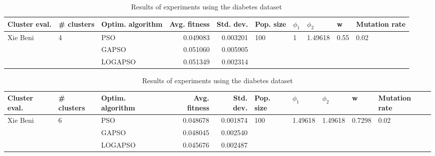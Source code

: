 \documentclass{article}
\begin{document}
\begin{table}
\centering
\caption{Results of experiments using the diabetes dataset}
\begin{tabular}{lllrrlllll}
\toprule
            Cluster eval. &        \# clusters & Optim. algorithm &  Avg. fitness &  Std. dev. &            Pop. size &         $\phi_{1}$ &               $\phi_{2}$ &                     w &         Mutation rate \\
\midrule
\multirow{3}{*}{Xie Beni} & \multirow{3}{*}{4} &              PSO &      0.049083 &   0.003201 & \multirow{3}{*}{100} & \multirow{3}{*}{1} & \multirow{3}{*}{1.49618} & \multirow{3}{*}{0.55} & \multirow{3}{*}{0.02} \\
                          &                    &            GAPSO &      0.051060 &   0.005905 &                      &                    &                          &                       &                       \\
                          &                    &          LOGAPSO &      0.051349 &   0.002314 &                      &                    &                          &                       &                       \\
\bottomrule
\end{tabular}
\end{table}
\begin{table}
\centering
\caption{Results of experiments using the diabetes dataset}
\begin{tabular}{lllrrlllll}
\toprule
            Cluster eval. &        \# clusters & Optim. algorithm &  Avg. fitness &  Std. dev. &            Pop. size &               $\phi_{1}$ &               $\phi_{2}$ &                       w &         Mutation rate \\
\midrule
\multirow{3}{*}{Xie Beni} & \multirow{3}{*}{6} &              PSO &      0.048678 &   0.001874 & \multirow{3}{*}{100} & \multirow{3}{*}{1.49618} & \multirow{3}{*}{1.49618} & \multirow{3}{*}{0.7298} & \multirow{3}{*}{0.02} \\
                          &                    &            GAPSO &      0.048045 &   0.002540 &                      &                          &                          &                         &                       \\
                          &                    &          LOGAPSO &      0.045676 &   0.002487 &                      &                          &                          &                         &                       \\
\bottomrule
\end{tabular}
\end{table}
\end{document}
